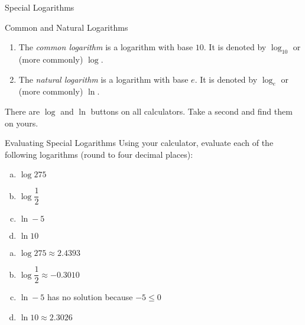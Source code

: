 \documentclass[t, aspectratio=169]{beamer}
\begin{document}
	\begin{frame}{Special Logarithms}
		\begin{block}{Common and Natural Logarithms}
			\begin{enumerate}[1)]
				\item The \textit{common logarithm} is a logarithm with base $10$. It is denoted by $\log_{10}$ or (more commonly) $\log$.
				\item The \textit{natural logarithm} is a logarithm with base $e$. It is denoted by $\log_e$ or (more commonly) $\ln$.
			\end{enumerate}
		\end{block} \pause
	
		There are $\log$ and $\ln$ buttons on all calculators. Take a second and find them on yours.
	\end{frame}

	\begin{frame}{Evaluating Special Logarithms}
		Using your calculator, evaluate each of the following logarithms (round to four decimal places): \begin{enumerate}[a)]
			\item $\log 275$
			\item $\log \dfrac12$
			\item $\ln -5$
			\item $\ln 10$
		\end{enumerate} \pause
		\begin{enumerate}[a)]
			\item $\log 275 \approx 2.4393$
			\item $\log \dfrac12 \approx -0.3010$
			\item $\ln -5$ has no solution because $-5 \leq 0$
			\item $\ln 10 \approx 2.3026$
		\end{enumerate}
	\end{frame}
\end{document}
